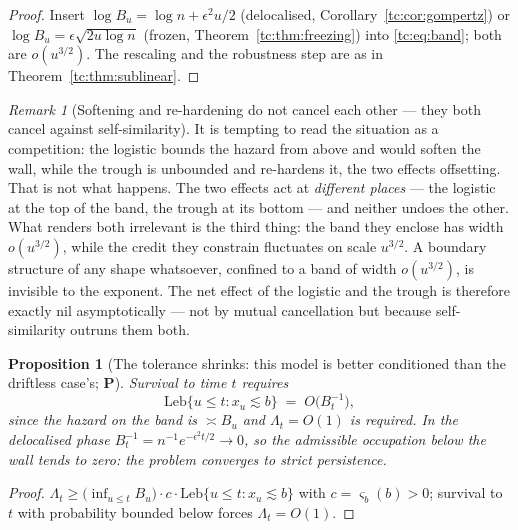 \documentclass[11pt]{article}
\numberwithin{equation}{section}
\theoremstyle{plain}
\newtheorem{proposition}[theorem]{Proposition}
\theoremstyle{definition}
\theoremstyle{remark}
\newtheorem{remark}[theorem]{Remark}
\begin{document}
\begin{proof}
Insert $\log B_u=\log n+\epsilon^{2}u/2$ (delocalised,
Corollary~\ref{tc:cor:gompertz}) or
$\log B_u=\epsilon\sqrt{2u\log n}$ (frozen,
Theorem~\ref{tc:thm:freezing}) into \eqref{tc:eq:band}; both are
$o(u^{3/2})$. The rescaling and the robustness step are as in
Theorem~\ref{tc:thm:sublinear}.
\end{proof}

\begin{remark}[Softening and re-hardening do not cancel each other ---
they both cancel against self-similarity]\label{tc:rem:netcancel}
It is tempting to read the situation as a competition: the logistic
bounds the hazard from above and would soften the wall, while the trough
is unbounded and re-hardens it, the two effects offsetting. That is not
what happens. The two effects act at \emph{different places} --- the
logistic at the top of the band, the trough at its bottom --- and
neither undoes the other. What renders both irrelevant is the third
thing: the band they enclose has width $o(u^{3/2})$, while the credit
they constrain fluctuates on scale $u^{3/2}$. A boundary structure of
any shape whatsoever, confined to a band of width $o(u^{3/2})$, is
invisible to the exponent. The net effect of the logistic and the trough
is therefore exactly nil asymptotically --- not by mutual cancellation
but because self-similarity outruns them both.
\end{remark}

\begin{proposition}[The tolerance shrinks: this model is better
conditioned than the driftless case's; \textbf{P}]\label{tc:prop:tolerance}
Survival to time $t$ requires
\begin{equation}\label{tc:eq:tolerance}
\mathrm{Leb}\{u\le t:x_u\lesssim b\}\;=\;O\!\bigl(B_t^{-1}\bigr),
\end{equation}
since the hazard on the band is $\asymp B_u$ and $\Lambda_t=O(1)$ is
required. In the delocalised phase $B_t^{-1}=n^{-1}e^{-\epsilon^{2}t/2}
\to0$, so the admissible occupation below the wall tends to zero: the
problem converges to \emph{strict} persistence.
\end{proposition}

\begin{proof}
$\Lambda_t\ge\bigl(\inf_{u\le t}B_u\bigr)\cdot c\cdot
\mathrm{Leb}\{u\le t:x_u\lesssim b\}$ with $c=\varsigma_b(b)>0$;
survival to $t$ with probability bounded below forces $\Lambda_t=O(1)$.
\end{proof}
\end{document}
